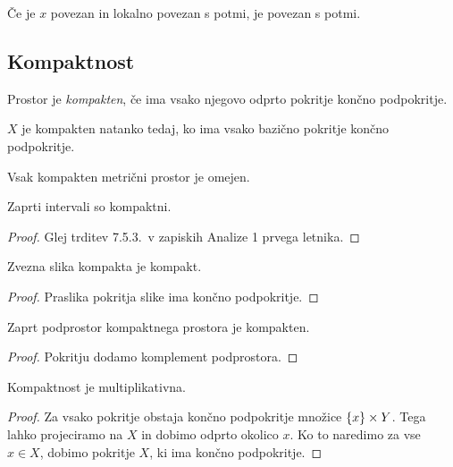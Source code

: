 \begin{posledica}
Če je $x$ povezan in lokalno povezan s potmi, je povezan s potmi.
\end{posledica}

\newpage

\subsection{Kompaktnost}

\begin{okvir}
\begin{definicija}
Prostor je \emph{kompakten},
če ima vsako njegovo odprto pokritje končno podpokritje.
\end{definicija}
\end{okvir}

\begin{trditev}
$X$ je kompakten natanko tedaj, ko ima vsako bazično pokritje
končno podpokritje.
\end{trditev}

\obvs

\begin{izrek}
Vsak kompakten metrični prostor je omejen.
\end{izrek}

\obvs

\begin{izrek}
Zaprti intervali so kompaktni.
\end{izrek}

\begin{proof}
Glej trditev 7.5.3.\ v zapiskih Analize 1 prvega letnika.
\end{proof}

\begin{izrek}
Zvezna slika kompakta je kompakt.
\end{izrek}

\begin{proof}
Praslika pokritja slike ima končno podpokritje.
\end{proof}

\begin{trditev}
Zaprt podprostor kompaktnega prostora je kompakten.
\end{trditev}

\begin{proof}
Pokritju dodamo komplement podprostora.
\end{proof}

\begin{izrek}
Kompaktnost je multiplikativna.
\end{izrek}

\begin{proof}
Za vsako pokritje obstaja končno podpokritje množice
$\left\{x\right\} \times Y$. Tega lahko projeciramo na $X$ in dobimo odprto
okolico $x$. Ko to naredimo za vse $x \in X$, dobimo pokritje $X$,
ki ima končno podpokritje.
\end{proof}
